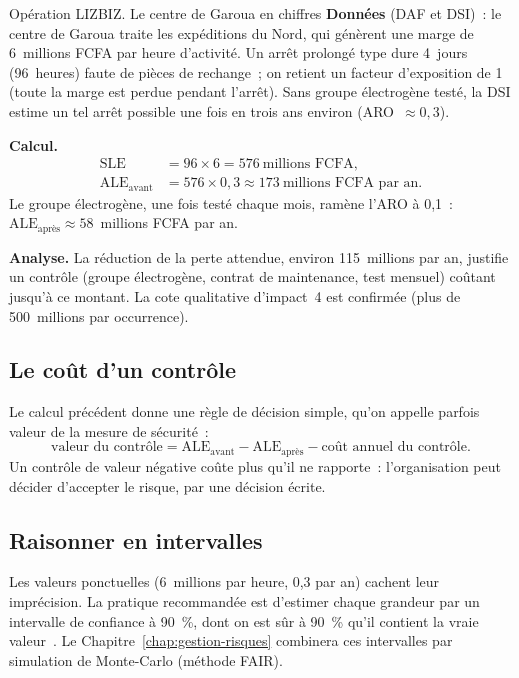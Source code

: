 \begin{boxscenario}{Opération LIZBIZ. Le centre de Garoua en chiffres}
\textbf{Données} (DAF et DSI)~: le centre de Garoua traite les expéditions
du Nord, qui génèrent une marge de 6~millions FCFA par heure d'activité. Un
arrêt prolongé type dure 4~jours (96~heures) faute de pièces de rechange~;
on retient un facteur d'exposition de 1 (toute la marge est perdue pendant
l'arrêt). Sans groupe électrogène testé, la DSI estime un tel arrêt
possible une fois en trois ans environ (ARO~$\approx 0{,}3$).

\medskip
\textbf{Calcul.}
\begin{align*}
\text{SLE} &= 96 \times 6 = 576~\text{millions FCFA}, \\
\text{ALE}_{\text{avant}} &= 576 \times 0{,}3 \approx 173~\text{millions FCFA par an}.
\end{align*}
Le groupe électrogène, une fois testé chaque mois, ramène l'ARO à 0,1~:
$\text{ALE}_{\text{après}} \approx 58$~millions FCFA par an.

\medskip
\textbf{Analyse.} La réduction de la perte attendue, environ 115~millions
par an, justifie un contrôle (groupe électrogène, contrat de maintenance,
test mensuel) coûtant jusqu'à ce montant. La cote qualitative d'impact~4
est confirmée (plus de 500~millions par occurrence).
\end{boxscenario}

\subsection{Le coût d'un contrôle}

Le calcul précédent donne une règle de décision simple, qu'on appelle
parfois valeur de la mesure de sécurité~:
\[
    \text{valeur du contrôle} = \text{ALE}_{\text{avant}}
    - \text{ALE}_{\text{après}} - \text{coût annuel du contrôle}.
\]
Un contrôle de valeur négative coûte plus qu'il ne rapporte~: l'organisation
peut décider d'accepter le risque, par une décision écrite.

\subsection{Raisonner en intervalles}

Les valeurs ponctuelles (6~millions par heure, 0,3 par an) cachent leur
imprécision. La pratique recommandée est d'estimer chaque grandeur par un
intervalle de confiance à 90~\%, dont on est sûr à 90~\% qu'il contient la
vraie valeur~\cite{hubbard2016cyber}. Le
Chapitre~\ref{chap:gestion-risques} combinera ces intervalles par
simulation de Monte-Carlo (méthode FAIR).

